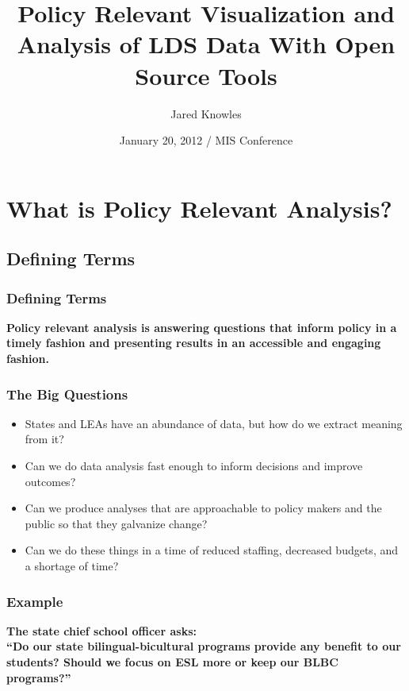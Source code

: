 \documentclass{beamer}
\title [Policy Relevant Research with LDS Data]{Policy Relevant Visualization and Analysis of LDS Data With Open Source Tools}
\author{Jared Knowles}
\institute[DPI] %
{
  Policy Research Advisor\\
  Wisconsin Department of Public Instruction
}
\date[MIS] %
{January 20, 2012 / MIS Conference}
\begin{document}
\begin{frame}
  \titlepage
\end{frame}




\section{What is Policy Relevant Analysis?}
\label{sec:pol-rel-analysis}

\subsection{Defining Terms}

\begin{frame}
\frametitle{Defining Terms}
\Large \textbf{Policy relevant analysis is answering questions that inform policy in a timely fashion and presenting results in an accessible and engaging fashion.}
\end{frame}

\begin{frame}
\frametitle{The Big Questions}
  \begin{itemize}
  \item States and LEAs have an abundance of data, but how do 
  we extract meaning from it?
  \item Can we do data analysis fast enough to inform decisions and improve 
  outcomes?
  \item Can we produce analyses that are approachable to policy makers and the public so that they galvanize change?
  \item Can we do these things in a time of reduced staffing, decreased 
  budgets, and a shortage of time?
  \end{itemize}
\end{frame}

\begin{frame}
\frametitle{Example}
\begin{center}
\textbf{The state chief school officer asks: \\ 
``Do our state bilingual-bicultural programs provide any benefit to our students? Should we focus on ESL more or keep our BLBC programs?''}
\end{center}
\end{frame}
\end{document}
